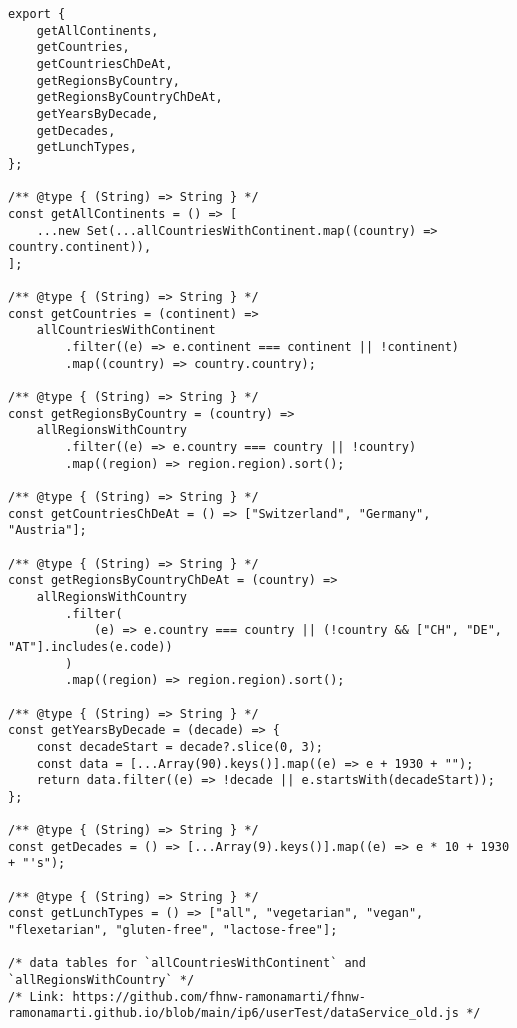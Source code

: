 


\begin{lstlisting}[style = htmlcssjs, caption = \codestyle{dataService.js}, label = code:dataServiceJs]
export {
    getAllContinents,
    getCountries,
    getCountriesChDeAt,
    getRegionsByCountry,
    getRegionsByCountryChDeAt,
    getYearsByDecade,
    getDecades,
    getLunchTypes,
};

/** @type { (String) => String } */
const getAllContinents = () => [
    ...new Set(...allCountriesWithContinent.map((country) => country.continent)),
];

/** @type { (String) => String } */
const getCountries = (continent) =>
    allCountriesWithContinent
        .filter((e) => e.continent === continent || !continent)
        .map((country) => country.country);

/** @type { (String) => String } */
const getRegionsByCountry = (country) =>
    allRegionsWithCountry
        .filter((e) => e.country === country || !country)
        .map((region) => region.region).sort();

/** @type { (String) => String } */
const getCountriesChDeAt = () => ["Switzerland", "Germany", "Austria"];

/** @type { (String) => String } */
const getRegionsByCountryChDeAt = (country) =>
    allRegionsWithCountry
        .filter(
            (e) => e.country === country || (!country && ["CH", "DE", "AT"].includes(e.code))
        )
        .map((region) => region.region).sort();

/** @type { (String) => String } */
const getYearsByDecade = (decade) => {
    const decadeStart = decade?.slice(0, 3);
    const data = [...Array(90).keys()].map((e) => e + 1930 + "");
    return data.filter((e) => !decade || e.startsWith(decadeStart));
};

/** @type { (String) => String } */
const getDecades = () => [...Array(9).keys()].map((e) => e * 10 + 1930 + "'s");

/** @type { (String) => String } */
const getLunchTypes = () => ["all", "vegetarian", "vegan", "flexetarian", "gluten-free", "lactose-free"];

/* data tables for `allCountriesWithContinent` and `allRegionsWithCountry` */
/* Link: https://github.com/fhnw-ramonamarti/fhnw-ramonamarti.github.io/blob/main/ip6/userTest/dataService_old.js */
\end{lstlisting}


